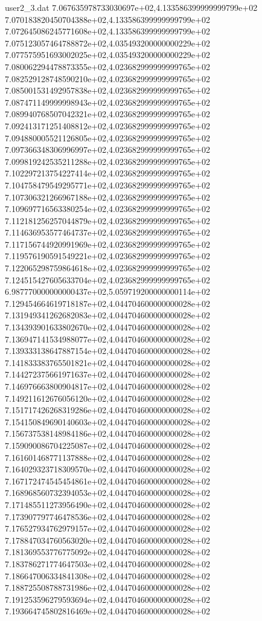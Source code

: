 \begin{filecontents}{user2_3.dat}
7.067635978733030697e+02,4.133586399999999799e+02
7.070183820450704388e+02,4.133586399999999799e+02
7.072645086245771608e+02,4.133586399999999799e+02
7.075123057464788872e+02,4.035493200000000229e+02
7.077575951693002025e+02,4.035493200000000229e+02
7.080062294478873355e+02,4.023682999999999765e+02
7.082529128748590210e+02,4.023682999999999765e+02
7.085001531492957838e+02,4.023682999999999765e+02
7.087471149999998943e+02,4.023682999999999765e+02
7.089940768507042321e+02,4.023682999999999765e+02
7.092413171251408812e+02,4.023682999999999765e+02
7.094880005521126805e+02,4.023682999999999765e+02
7.097366348306996997e+02,4.023682999999999765e+02
7.099819242535211288e+02,4.023682999999999765e+02
7.102297213754227414e+02,4.023682999999999765e+02
7.104758479549295771e+02,4.023682999999999765e+02
7.107306321266967188e+02,4.023682999999999765e+02
7.109697716563380254e+02,4.023682999999999765e+02
7.112181256257044879e+02,4.023682999999999765e+02
7.114636953577464737e+02,4.023682999999999765e+02
7.117156744920991969e+02,4.023682999999999765e+02
7.119576190591549221e+02,4.023682999999999765e+02
7.122065298759864618e+02,4.023682999999999765e+02
7.124515427605633704e+02,4.023682999999999765e+02
6.987770000000000437e+02,5.059719200000000114e+02
7.129454664619718187e+02,4.044704600000000028e+02
7.131949341262682083e+02,4.044704600000000028e+02
7.134393901633802670e+02,4.044704600000000028e+02
7.136947141534988077e+02,4.044704600000000028e+02
7.139333138647887154e+02,4.044704600000000028e+02
7.141833383765501821e+02,4.044704600000000028e+02
7.144272375661971637e+02,4.044704600000000028e+02
7.146976663800904817e+02,4.044704600000000028e+02
7.149211612676056120e+02,4.044704600000000028e+02
7.151717426268319286e+02,4.044704600000000028e+02
7.154150849690140603e+02,4.044704600000000028e+02
7.156737538148984186e+02,4.044704600000000028e+02
7.159090086704225087e+02,4.044704600000000028e+02
7.161601468771137888e+02,4.044704600000000028e+02
7.164029323718309570e+02,4.044704600000000028e+02
7.167172474545454861e+02,4.044704600000000028e+02
7.168968560732394053e+02,4.044704600000000028e+02
7.171485511273956490e+02,4.044704600000000028e+02
7.173907797746478536e+02,4.044704600000000028e+02
7.176527934762979157e+02,4.044704600000000028e+02
7.178847034760563020e+02,4.044704600000000028e+02
7.181369553776775092e+02,4.044704600000000028e+02
7.183786271774647503e+02,4.044704600000000028e+02
7.186647006334841308e+02,4.044704600000000028e+02
7.188725508788731986e+02,4.044704600000000028e+02
7.191253596279593694e+02,4.044704600000000028e+02
7.193664745802816469e+02,4.044704600000000028e+02

\end{filecontents}
